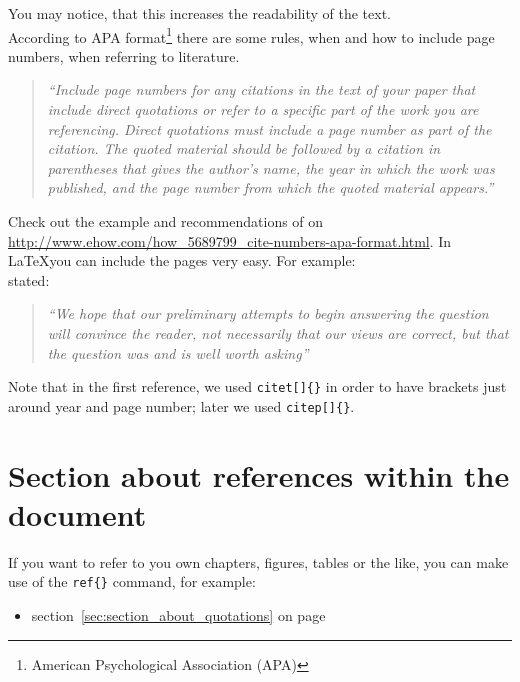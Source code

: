 \documentclass[a4paper]{article}
\begin{document}
You may notice, that this increases the readability of the text. \\

According to APA format\footnote{ American Psychological Association (APA)} there are some rules, when and how to include page numbers, when referring to literature.

\begin{quotation}
	\emph{``Include page numbers for any citations in the text of your paper that include direct quotations or refer to a specific part of the work you are referencing. Direct quotations must include a page number as part of the citation. The quoted material should be followed by a citation in parentheses that gives the author's name, the year in which the work was published, and the page number from which the quoted material appears.''}
	\citep{Hall}
\end{quotation}

Check out the example and recommendations of \cite{Hall} on \url{http://www.ehow.com/how_5689799_cite-numbers-apa-format.html}. In \LaTeX you can include the pages very easy. For example: \\

\citet[p. 86]{Baddeley:1974ts} stated:

\begin{quotation}
	\emph{``We hope that our preliminary attempts to begin answering the question will convince the reader, not necessarily that our views are correct, but that the question was and is well worth asking''}
	\citep[p. 86]{Baddeley:1974ts}
\end{quotation}

Note that in the first reference, we used \texttt{citet[]\{\}} in order to have brackets just around year and page number; later we used \texttt{citep[]\{\}}.



\section{Section about references within the document} %
\label{sec:section_about_references_within_the_document}

If you want to refer to you own chapters, figures, tables or the like, you can make use of the \texttt{ref\{\}} command, for example:
\begin{itemize}
	\item section~\ref{sec:section_about_quotations} on page \pageref{sec:section_about_quotations}
\end{itemize}
\end{document}
